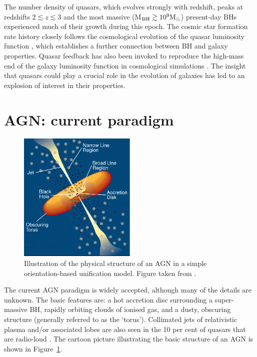 The number density of quasars, which evolves strongly with redshift, peaks at redshifts $2 \lesssim z \lesssim 3$ \citep[e.g.][]{brandt05,richards06b} and the most massive (M$_{\rm BH} \gtrsim 10^9{{{\rm M_\odot}}}$) present-day BHs experienced much of their growth during this epoch.  
The cosmic star formation rate history closely follows the cosmological evolution of the quasar luminosity function \citep[e.g.][]{boyle98}, which establishes a further connection between BH and galaxy properties.
Quasar feedback has also been invoked to reproduce the high-mass end of the galaxy luminosity function in cosmological simulations \citep[e.g.][]{kauffmann00}.
The insight that quasars could play a crucial role in the evolution of galaxies has led to an explosion of interest in their properties. 

\section{AGN: current paradigm}

\begin{figure}
  \centering
  \includegraphics[width=0.5\textwidth]{figures/chapter05/urry_model}
  \caption[{Illustration of the physical structure of an AGN in a simple orientation-based unification model.}]{Illustration of the physical structure of an AGN in a simple orientation-based unification model. Figure taken from \citet{urry95}.}
  \label{fig:agnmodel}
\end{figure}

The current AGN paradigm is widely accepted, although many of the details are unknown. 
The basic features are: a hot accretion disc surrounding a super-massive BH, rapidly orbiting clouds of ionised gas, and a dusty, obscuring structure (generally referred to as the `torus'). 
Collimated jets of relativistic plasma and/or associated lobes are also seen in the 10 per cent of quasars that are radio-loud \citep[e.g.][]{peterson97}. 
The cartoon picture illustrating the basic structure of an AGN is shown in Figure~\ref{fig:agnmodel}. 

